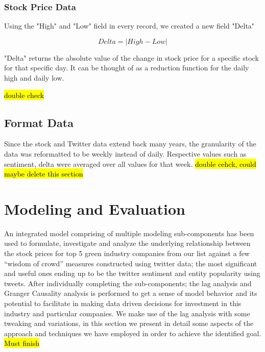 \documentclass[sigconf, nonacm]{acmart}
\begin{document}
\subsubsection{Stock Price Data}
Using the "High" and "Low" field in every record, we created a new field "Delta"

$$ Delta = |High - Low|$$

"Delta" returns the absolute value of the change in stock price for a specific stock for that specific day. It can be thought of as a reduction function for the daily high and daily low.

\hl{double check}

\subsection{Format Data } 
Since the stock and Twitter data extend back many years, the granularity of the data was reformatted to be weekly instead of daily. Respective values such as sentiment, delta were averaged over all values for that week.
\hl{double cehck, could maybe delete this section}

\section{Modeling and Evaluation}
An integrated model comprising of multiple modeling sub-components has been used to formulate, investigate and analyze the underlying relationship between the stock prices for top 5 green industry companies from our list against a few “wisdom of crowd” measures constructed using twitter data; the most significant and useful ones ending up to be the twitter sentiment and entity popularity using tweets. After individually completing the sub-components; the lag analysis and Granger Causality analysis is performed to get a sense of model behavior and its potential to facilitate in making data driven decisions for investment in this industry and particular companies. We make use of the lag analysis with some tweaking and variations, in this section we present in detail some aspects of the approach and techniques we have employed in order to achieve the identified goal.
\hl{Must finish}



\end{document}
